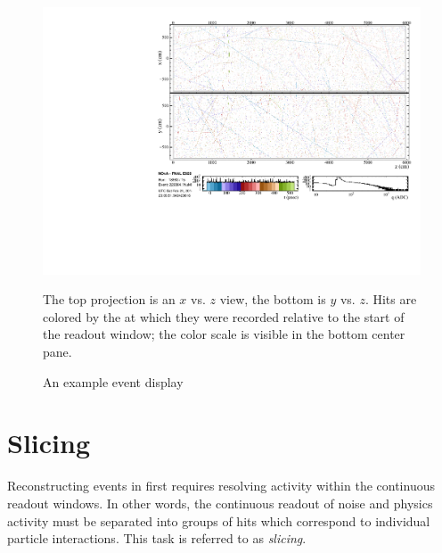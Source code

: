 \begin{figure}[t]
\begin{center}
\includegraphics[width=\textwidth]{figures/evd/evd_14db.pdf}
\end{center}
\caption{An example \nova event display}{
The top projection is an $x$ vs. $z$ view, the bottom is $y$ vs. $z$.
Hits are colored by the at which they were recorded relative to the start of
the readout window; the color scale is visible in the bottom center pane.}
\label{eventDisplay14}
\end{figure}

\section{Slicing}
\label{slicer_section}

Reconstructing events in \nova first requires resolving activity within the
continuous readout windows.
In other words, the continuous readout of noise and physics activity must be
separated into groups of hits which correspond to individual particle
interactions.
This task is referred to as \textit{slicing}.


